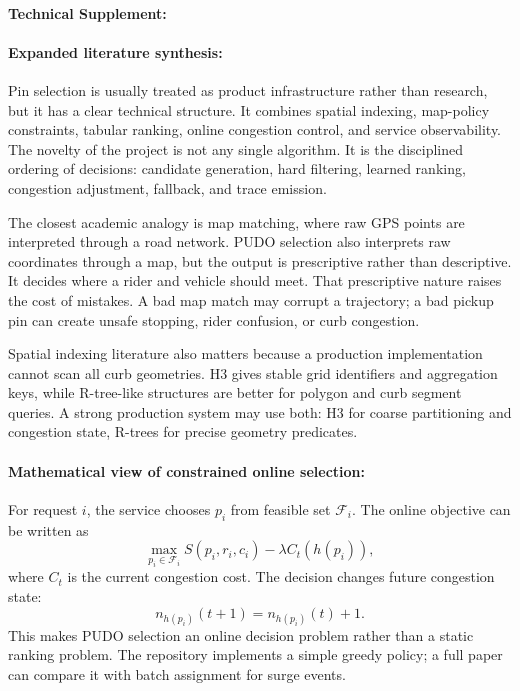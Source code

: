 \documentclass{article}
\begin{document}
\paragraph{Technical Supplement:}

\paragraph{Expanded literature synthesis:}

Pin selection is usually treated as product infrastructure rather than research, but it has a clear technical structure. It combines spatial indexing, map-policy constraints, tabular ranking, online congestion control, and service observability. The novelty of the project is not any single algorithm. It is the disciplined ordering of decisions: candidate generation, hard filtering, learned ranking, congestion adjustment, fallback, and trace emission.

The closest academic analogy is map matching, where raw GPS points are interpreted through a road network. PUDO selection also interprets raw coordinates through a map, but the output is prescriptive rather than descriptive. It decides where a rider and vehicle should meet. That prescriptive nature raises the cost of mistakes. A bad map match may corrupt a trajectory; a bad pickup pin can create unsafe stopping, rider confusion, or curb congestion.

Spatial indexing literature also matters because a production implementation cannot scan all curb geometries. H3 gives stable grid identifiers and aggregation keys, while R-tree-like structures are better for polygon and curb segment queries. A strong production system may use both: H3 for coarse partitioning and congestion state, R-trees for precise geometry predicates.

\paragraph{Mathematical view of constrained online selection:}

For request $i$, the service chooses $p_i$ from feasible set $\mathcal{F}_i$. The online objective can be written as
\begin{equation}
  \max_{p_i\in\mathcal{F}_i} S(p_i,r_i,c_i)-\lambda C_t(h(p_i)),
\end{equation}
where $C_t$ is the current congestion cost. The decision changes future congestion state:
\begin{equation}
  n_{h(p_i)}(t+1)=n_{h(p_i)}(t)+1.
\end{equation}
This makes PUDO selection an online decision problem rather than a static ranking problem. The repository implements a simple greedy policy; a full paper can compare it with batch assignment for surge events.
\end{document}
